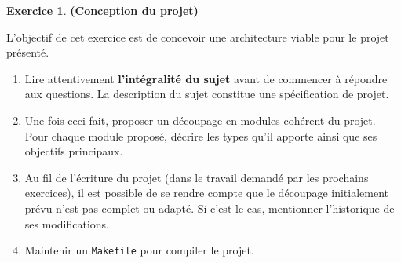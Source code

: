 \documentclass[11pt]{article}
\theoremstyle{definition}
\newtheorem{Exercice}{Exercice}
\begin{document}
\begin{Exercice} {\bf (Conception du projet)}\smallskip

L'objectif de cet exercice est de concevoir une architecture viable pour
le projet présenté.
\smallskip

\begin{enumerate}
    \item Lire attentivement {\bf l'intégralité du sujet} avant de
    commencer à répondre aux questions. La description du sujet constitue
    une spécification de projet.
    \smallskip

    \item Une fois ceci fait, proposer un découpage en modules cohérent
    du projet. Pour chaque module proposé, décrire les types qu'il apporte
    ainsi que ses objectifs principaux.
    \smallskip

    \item Au fil de l'écriture du projet (dans le travail demandé par les
    prochains exercices), il est possible de se rendre compte que le
    découpage initialement prévu n'est pas complet ou adapté. Si c'est
    le cas, mentionner l'historique de ses modifications.
    \smallskip

    \item Maintenir un {\tt Makefile} pour compiler le projet.
\end{enumerate}
\end{Exercice}
\bigskip
\end{document}
